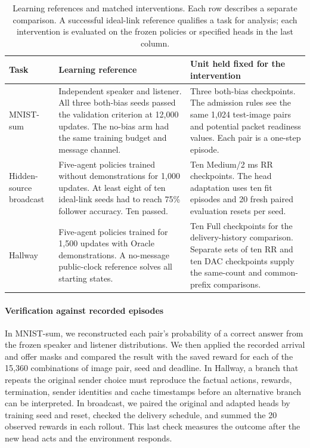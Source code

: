 \documentclass[a4paper,fleqn]{cas-dc}
\begin{document}
\begin{table}[pos=t]\centering\small
\caption{Learning references and matched interventions. Each row describes a separate comparison. A successful ideal-link reference qualifies a task for analysis; each intervention is evaluated on the frozen policies or specified heads in the last column.}\label{tab:cohorts}
\begin{tabularx}{\textwidth}{@{}p{}XX@{}}
\toprule
Task & Learning reference & Unit held fixed for the intervention\\
\midrule
MNIST-sum & Independent speaker and listener. All three both-bias seeds passed the validation criterion at 12,000 updates. The no-bias arm had the same training budget and message channel. & Three both-bias checkpoints. The admission rules see the same 1,024 test-image pairs and potential packet readiness values. Each pair is a one-step episode.\\[3pt]
Hidden-source broadcast & Five-agent policies trained without demonstrations for 1,000 updates. At least eight of ten ideal-link seeds had to reach 75\% follower accuracy. Ten passed. & Ten Medium/2 ms RR checkpoints. The head adaptation uses ten fit episodes and 20 fresh paired evaluation resets per seed.\\[3pt]
Hallway & Five-agent policies trained for 1,500 updates with Oracle demonstrations. A no-message public-clock reference solves all starting states. & Ten Full checkpoints for the delivery-history comparison. Separate sets of ten RR and ten DAC checkpoints supply the same-count and common-prefix comparisons.\\
\bottomrule
\end{tabularx}
\end{table}
\paragraph{Verification against recorded episodes}
In MNIST-sum, we reconstructed each pair's probability of a correct answer from the frozen speaker and listener distributions. We then applied the recorded arrival and offer masks and compared the result with the saved reward for each of the 15,360 combinations of image pair, seed and deadline. In Hallway, a branch that repeats the original sender choice must reproduce the factual actions, rewards, termination, sender identities and cache timestamps before an alternative branch can be interpreted. In broadcast, we paired the original and adapted heads by training seed and reset, checked the delivery schedule, and summed the 20 observed rewards in each rollout. This last check measures the outcome after the new head acts and the environment responds.
\end{document}
